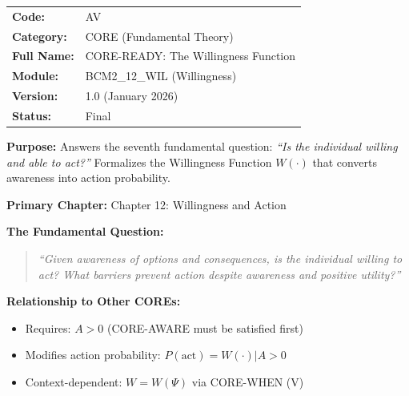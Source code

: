 %
%
%

\begin{tcolorbox}[colback=gray!5!white, colframe=gray!75!black,
    title=Appendix Header: AV CORE-READY]

\begin{tabular}{@{}ll@{}}
\textbf{Code:} & AV \\
\textbf{Category:} & CORE (Fundamental Theory) \\
\textbf{Full Name:} & CORE-READY: The Willingness Function \\
\textbf{Module:} & BCM2\_12\_WIL (Willingness) \\
\textbf{Version:} & 1.0 (January 2026) \\
\textbf{Status:} & Final \\
\end{tabular}

\vspace{0.5em}
\textbf{Purpose:} Answers the seventh fundamental question:
\textit{``Is the individual willing and able to act?''}
Formalizes the Willingness Function $W(\cdot)$ that converts awareness into action probability.

\end{tcolorbox}

\begin{tcolorbox}[colback=purple!5!white, colframe=purple!75!black,
    title=Chapter Linkage]

\textbf{Primary Chapter:} Chapter 12: Willingness and Action

\textbf{The Fundamental Question:}
\begin{quote}
\textit{``Given awareness of options and consequences, is the individual willing
to act? What barriers prevent action despite awareness and positive utility?''}
\end{quote}

\textbf{Relationship to Other COREs:}
\begin{itemize}[nosep]
\item Requires: $A > 0$ (CORE-AWARE must be satisfied first)
\item Modifies action probability: $P(\text{act}) = W(\cdot) | A > 0$
\item Context-dependent: $W = W(\Psi)$ via CORE-WHEN (V)
\end{itemize}

\end{tcolorbox}

